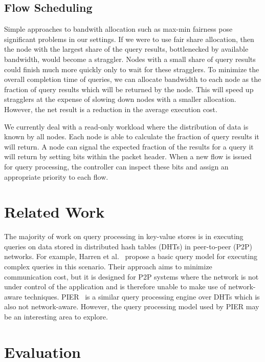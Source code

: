 \documentclass{sig-alternate-2013}
\begin{document}
\subsection{Flow Scheduling}

Simple approaches to bandwith allocation such as max-min fairness pose significant problems in our settings.
If we were to use fair share allocation, then the node with the largest share of the query results, bottlenecked by available bandwidth, would become a straggler.
Nodes with a small share of query results could finish much more quickly only to wait for these stragglers.
To minimize the overall completion time of queries, we can allocate bandwidth to each node as the fraction of query results which will be returned by the node.
This will speed up stragglers at the expense of slowing down nodes with a smaller allocation.
However, the net result is a reduction in the average execution cost.

We currently deal with a read-only workload where the distribution of data is known by all nodes.
Each node is able to calculate the fraction of query results it will return.
A node can signal the expected fraction of the results for a query it will return by setting bits within the packet header.
When a new flow is issued for query processing, the controller can inspect these bits and assign an appropriate priority to each flow.

\section{Related Work}

The majority of work on query processing in key-value stores is in executing queries on data stored in distributed hash tables (DHTs) in peer-to-peer (P2P) networks.
For example, Harren et al.~\cite{Harren2002} propose a basic query model for executing complex queries in this scenario.
Their approach aims to minimize communication cost, but it is designed for P2P systems where the network is not under control of the application and is therefore unable to make use of network-aware techniques.
PIER~\cite{Huebsch2005} is a similar query processing engine over DHTs which is also not network-aware.
However, the query processing model used by PIER may be an interesting area to explore.

\section{Evaluation}
\end{document}
